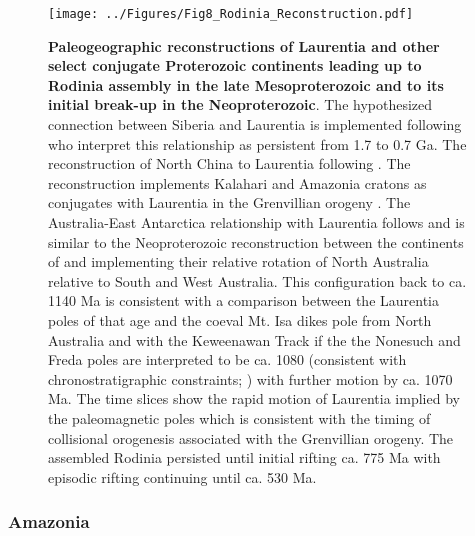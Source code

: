 \documentclass[twocolumn, switch]{article} %
\begin{document}
\begin{figure}
\centering
\texttt{[image: ../Figures/Fig8\_Rodinia\_Reconstruction.pdf]}
\caption{\textbf{Paleogeographic reconstructions of Laurentia and other select conjugate Proterozoic continents leading up to Rodinia assembly in the late Mesoproterozoic and to its initial break-up in the Neoproterozoic}. The hypothesized connection between Siberia and Laurentia is implemented following \cite{Evans2016b} who interpret this relationship as persistent from 1.7 to 0.7 Ga. The reconstruction of North China to Laurentia following \cite{Ding2021a}. The reconstruction implements Kalahari and Amazonia cratons as conjugates with Laurentia in the Grenvillian orogeny \citep{Hoffman1991a}. The Australia-East Antarctica relationship with Laurentia follows \cite{Swanson-Hysell2012a} and is similar to the Neoproterozoic reconstruction between the continents of \cite{Li2011a} and implementing their relative rotation of North Australia relative to South and West Australia. This configuration back to ca. 1140 Ma is consistent with a comparison between the Laurentia poles of that age and the coeval Mt. Isa dikes pole from North Australia and with the Keweenawan Track if the the Nonesuch and Freda poles are interpreted to be ca. 1080 (consistent with chronostratigraphic constraints; \citealp{Slotznick2018b}) with further motion by ca. 1070 Ma. The time slices show the rapid motion of Laurentia implied by the paleomagnetic poles which is consistent with the timing of collisional orogenesis associated with the Grenvillian orogeny. The assembled Rodinia persisted until initial rifting ca. 775 Ma with episodic rifting continuing until ca. 530 Ma.}
\label{fig:Grenville_reconstructions}
\end{figure}

\subsubsection{Amazonia}
\end{document}
